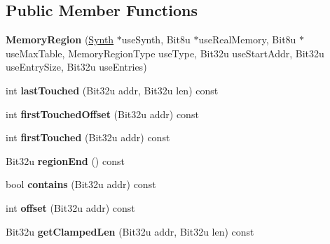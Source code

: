 \subsection*{Public Member Functions}
\begin{DoxyCompactItemize}
\item 
\hypertarget{classMT32Emu_1_1MemoryRegion_ab9d94dabb77766dc9126f4567bf44130}{{\bfseries Memory\-Region} (\hyperlink{classMT32Emu_1_1Synth}{Synth} $\ast$use\-Synth, Bit8u $\ast$use\-Real\-Memory, Bit8u $\ast$use\-Max\-Table, Memory\-Region\-Type use\-Type, Bit32u use\-Start\-Addr, Bit32u use\-Entry\-Size, Bit32u use\-Entries)}\label{classMT32Emu_1_1MemoryRegion_ab9d94dabb77766dc9126f4567bf44130}

\item 
\hypertarget{classMT32Emu_1_1MemoryRegion_aad99637a4ee3c4ad14f13d38890c09b0}{int {\bfseries last\-Touched} (Bit32u addr, Bit32u len) const }\label{classMT32Emu_1_1MemoryRegion_aad99637a4ee3c4ad14f13d38890c09b0}

\item 
\hypertarget{classMT32Emu_1_1MemoryRegion_a3b4a755ae0b307f8e46c09261f5a759c}{int {\bfseries first\-Touched\-Offset} (Bit32u addr) const }\label{classMT32Emu_1_1MemoryRegion_a3b4a755ae0b307f8e46c09261f5a759c}

\item 
\hypertarget{classMT32Emu_1_1MemoryRegion_ae377f2deba32b8eef139463022707c7a}{int {\bfseries first\-Touched} (Bit32u addr) const }\label{classMT32Emu_1_1MemoryRegion_ae377f2deba32b8eef139463022707c7a}

\item 
\hypertarget{classMT32Emu_1_1MemoryRegion_a5c9fc9aef203220152274565ddda9bd7}{Bit32u {\bfseries region\-End} () const }\label{classMT32Emu_1_1MemoryRegion_a5c9fc9aef203220152274565ddda9bd7}

\item 
\hypertarget{classMT32Emu_1_1MemoryRegion_a1d18633b9eb088867edc6f3efc98f449}{bool {\bfseries contains} (Bit32u addr) const }\label{classMT32Emu_1_1MemoryRegion_a1d18633b9eb088867edc6f3efc98f449}

\item 
\hypertarget{classMT32Emu_1_1MemoryRegion_a48b937ad591019b218a03691a35d56ca}{int {\bfseries offset} (Bit32u addr) const }\label{classMT32Emu_1_1MemoryRegion_a48b937ad591019b218a03691a35d56ca}

\item 
\hypertarget{classMT32Emu_1_1MemoryRegion_a5eb31fc058f3acaaf2736c563a908d08}{Bit32u {\bfseries get\-Clamped\-Len} (Bit32u addr, Bit32u len) const }\label{classMT32Emu_1_1MemoryRegion_a5eb31fc058f3acaaf2736c563a908d08}


\end{DoxyCompactItemize}
